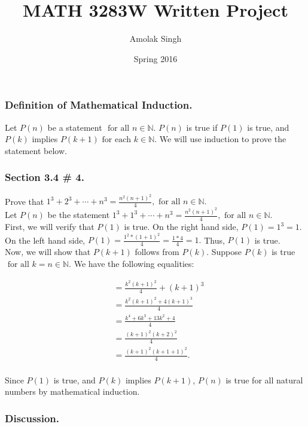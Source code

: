 \documentclass[11pt]{article}
\title{MATH 3283W Written Project}
\author{Amolak Singh}
\date{Spring 2016}
\newcommand{\N}{\mathbb{N}}
\begin{document}
\maketitle

\subsubsection*{Definition of Mathematical Induction.}

Let $P(n)$ be a statement $\mbox{ for all } n\in \N.$  $P(n)$ is true if $P(1)$ is true, and $P(k)$ implies $P(k+1) \mbox{ for each } k\in \N.$ We will use induction to prove the statement below.

\subsubsection*{Section 3.4 \# 4.}
Prove that $1^{3} + 2^{3} + \cdots + n^{3} = \frac{n^{2}(n+1)^{2}}{4}, \mbox{ for all } n\in \N.$ \\

Let $P(n)$ be the statement $1^{3} + 1^{3} + \cdots + n^{3} = \frac{n^{2}(n+1)^{2}}{4}, \mbox{ for all } n\in \N.$\\

First, we will verify that $P(1)$ is true. 
On the right hand side, $P(1) = 1^{3} = 1.$ 
On the left hand side, $P(1) = \frac{1^{2}*(1+1)^{2}}{4} = \frac{1*4}{4} = 1.$ 
Thus, $P(1)$ is true. \\

Now, we will show that $P(k+1)$ follows from $P(k)$. 
Suppose $P(k)$ is true $\mbox{ for all } k = n\in \mathbb{N}.$
We have the following equalities:

\begin{align*}
&= \frac{k^{2}(k+1)^{2}}{4} + (k+1)^{3}\\
&= \frac{k^{2}(k+1)^{2}+4(k+1)^{3}}{4}\\
&= \frac{k^{4}+6k^{3}+13k^{2}+4}{4} \\
&= \frac{(k+1)^{2}(k+2)^{2}}{4} \\
&= \frac{(k+1)^{2}(k+1+1)^{2}}{4}.
\end{align*}
\\  

Since $P(1)$ is true, and $P(k)$ implies $P(k+1)$, $P(n)$ is true for all natural numbers by mathematical induction.

\subsubsection*{Discussion.}
\end{document}

